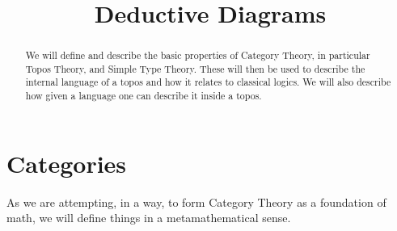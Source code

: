 \documentclass[12pt,a4paper]{article}
\title{Deductive Diagrams}
\date{}
\begin{document}
	

	
\maketitle

\begin{abstract}
We will define and describe the basic properties of Category Theory, in particular Topos Theory, and Simple Type Theory. 
These will then be used to describe the internal language of a topos and how it relates to classical logics. 
We will also describe how given a language one can describe it inside a topos.
\end{abstract}
\section{Categories}

As we are attempting, in a way, to form Category Theory as a foundation of math, we will define things in a metamathematical sense.
\end{document}
